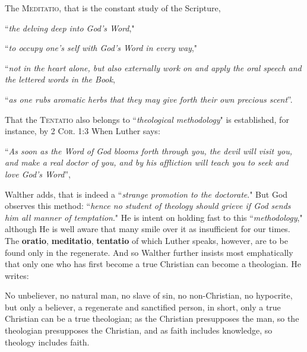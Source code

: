 The \textsc{Meditatio}, that is the constant study of the Scripture, \begin{displayquote}``\textit{the delving deep into God's Word},"
\begin{displayquote}``\textit{to occupy one's self with God's Word in every way},"
\begin{displayquote}``\textit{not in the heart alone, but also externally work on and apply the oral speech and the lettered words in the Book}, \begin{displayquote}``\textit{as one rubs aromatic herbs that they may give forth their own precious scent}''.\end{displayquote}\end{displayquote}\end{displayquote}\end{displayquote}
\divider
That the \textsc{Tentatio} also belongs to ``\textit{theological methodology}" is established, for instance, by {\scriptsize\textsc{2 Cor. 1:3}} When Luther says: \begin{displayquote}``\textit{As soon as the Word of God blooms forth through you, the devil will visit you, and make a real doctor of you, and by his affliction will teach you to seek and love God's Word}'',\end{displayquote}  Walther adds, that is indeed a ``\textit{strange promotion to the doctorate}." But God observes this method: ``\textit{hence no student of theology should grieve if God sends him all manner of temptation}." He is intent on holding fast to this ``\textit{methodology}," although He is well aware that many smile over it as insufficient for our times.
\divider
The \textbf{oratio}, \textbf{meditatio}, \textbf{tentatio} of which Luther speaks, however, are to be found only in the regenerate. And so Walther further insists most emphatically that only one who has first become a true Christian can become a theologian. He writes: \\\begin{fancyquotes}No unbeliever, no natural man, no slave of sin, no non-Christian, no hypocrite, but only a believer, a regenerate and sanctified person, in short, only a true Christian can be a true theologian; as the Christian presupposes the man, so the theologian presupposes the Christian, and as faith includes knowledge, so theology includes faith.\end{fancyquotes}

